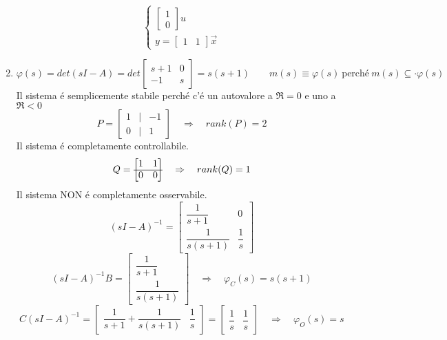 \documentclass[../main.tex]{subfiles}
\begin{document}
\begin{mdframed}[style=Esempio]
\begin{enumerate}
\[\begin{cases}
								\begin{bmatrix}
									1\\
									0
								\end{bmatrix} u
								\\[1em]
								y =
								\begin{bmatrix}
									1 & 1
								\end{bmatrix} \vec x
							\end{cases}
						\]
					\item 
						\[
							\varphi(s) = det(sI-A) = det
							\begin{bmatrix}
								s+1 & 0\\
								-1 & s
							\end{bmatrix} = s(s+1)
							\qquad
							m(s) \equiv \varphi(s)\ \text{perch\'e}\ m(s) \subseteq\cdot \varphi(s)
						\]
						Il sistema \'e semplicemente stabile perch\'e c'\'e un autovalore a $ \Re = 0 $ e uno a $ \Re < 0 $
						\[
							P =
							\begin{bmatrix}
								1 & | & -1\\
								0 & | & 1
							\end{bmatrix}
							\quad\Rightarrow\quad
							rank(P) = 2
						\]
						Il sistema \'e completamente controllabile.
						\[
							Q =
							\begin{bmatrix}
								1 & 1\\
								\cline{1-2}
								0 & 0
							\end{bmatrix}
							\quad\Rightarrow\quad
							rank(Q) = 1
						\]
						Il sistema NON \'e completamente osservabile.
						\[
							(sI-A)^{-1} =
							\begin{bmatrix}
								\dfrac{1}{s+1} & 0\\[.5cm]
								\dfrac{1}{s(s+1)} & \dfrac{1}{s}
							\end{bmatrix}
						\]
						\[
							(sI-A)^{-1}B =
							\begin{bmatrix}
								\dfrac{1}{s+1}\\[.5cm]
								\dfrac{1}{s(s+1)}
							\end{bmatrix}
							\quad\Rightarrow\quad
							\varphi_C(s) = s(s+1)
						\]
						\[
							C(sI-A)^{-1} = 
							\begin{bmatrix}
								\dfrac{1}{s+1}+\dfrac{1}{s(s+1)} & \dfrac{1}{s}
							\end{bmatrix} =
							\begin{bmatrix}
								\dfrac{1}{s} & \dfrac{1}{s}
							\end{bmatrix}
							\quad\Rightarrow\quad
							\varphi_O(s) = s
						\]
				\end{enumerate}
		\end{mdframed}
	
\end{document}
